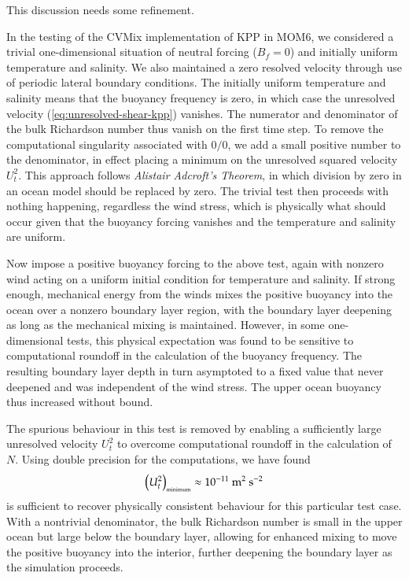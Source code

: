 \color{red} This discussion needs some refinement.  \color{black} 

In the testing of the CVMix implementation of KPP in MOM6, we
considered a trivial one-dimensional situation of neutral forcing
($B_{f} = 0$) and initially uniform temperature and salinity.  We also
maintained a zero resolved velocity through use of periodic lateral
boundary conditions.  The initially uniform temperature and salinity
means that the buoyancy frequency is zero, in which case the
unresolved velocity (\ref{eq:unresolved-shear-kpp}) vanishes.  The
numerator and denominator of the bulk Richardson number thus vanish on
the first time step.  To remove the computational singularity
associated with $0/0$, we add a small positive number to the
denominator, in effect placing a minimum on the unresolved squared
velocity $U_{t}^{2}$.  This approach follows {\it Alistair Adcroft's
  Theorem}, in which division by zero in an ocean model should be
replaced by zero.  The trivial test then proceeds with nothing
happening, regardless the wind stress, which is physically what should
occur given that the buoyancy forcing vanishes and the temperature and
salinity are uniform.

Now impose a positive buoyancy forcing to the above test, again with
nonzero wind acting on a uniform initial condition for temperature and
salinity.  If strong enough, mechanical energy from the winds mixes
the positive buoyancy into the ocean over a nonzero boundary layer
region, with the boundary layer deepening as long as the mechanical
mixing is maintained.  However, in some one-dimensional tests, this
physical expectation was found to be sensitive to computational
roundoff in the calculation of the buoyancy frequency.  The resulting
boundary layer depth in turn asymptoted to a fixed value that never
deepened and was independent of the wind stress.  The upper ocean
buoyancy thus increased without bound.  

The spurious behaviour in this test is removed by enabling a
sufficiently large unresolved velocity $U_{t}^{2}$ to overcome
computational roundoff in the calculation of $N$.  Using double
precision for the computations, we have found
\begin{equation}
  \left( U_{t}^{2} \right)_{\mbox{\tiny minimum}} \approx 10^{-11}~\mbox{m}^{2}~\mbox{s}^{-2}  
\end{equation}
is sufficient to recover physically consistent behaviour for this
particular test case.  With a nontrivial denominator, the bulk
Richardson number is small in the upper ocean but large below the
boundary layer, allowing for enhanced mixing to move the positive
buoyancy into the interior, further deepening the boundary layer as
the simulation proceeds.




